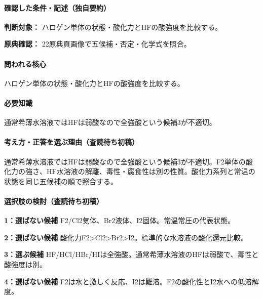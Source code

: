\paragraph{確認した条件・記述（独自要約）}\mbox{}\par

\noindent\textbf{判断対象：} ハロゲン単体の状態・酸化力とHFの酸強度を比較する。\par

\noindent\textbf{原典確認：} 22原典頁画像で五候補・否定・化学式を照合。\par

\paragraph{問われる核心} ハロゲン単体の状態・酸化力とHFの酸強度を比較する。

\paragraph{必要知識} 通常希薄水溶液ではHFは弱酸なので全強酸という候補3が不適切。

\paragraph{考え方・正答を選ぶ理由（査読待ち初稿）} 通常希薄水溶液ではHFは弱酸なので全強酸という候補3が不適切。F2単体の酸化力の強さ、HF水溶液の解離、毒性・腐食性は別の性質。酸化力系列と常温の状態を同じ五候補の順で照合する。

\paragraph{選択肢の検討（査読待ち初稿）}\mbox{}\par

\noindent\textbf{1：選ばない候補} F2/Cl2気体、Br2液体、I2固体。常温常圧の代表状態。\par

\noindent\textbf{2：選ばない候補} 酸化力F2>Cl2>Br2>I2。標準的な水溶液の酸化還元比較。\par

\noindent\textbf{3：選ぶ候補} HF/HCl/HBr/HIは全強酸。通常希薄水溶液のHFは弱酸で、毒性と酸強度は別。\par

\noindent\textbf{4：選ばない候補} F2は水と激しく反応、I2は難溶。F2の酸化性とI2水への低溶解度。\par

